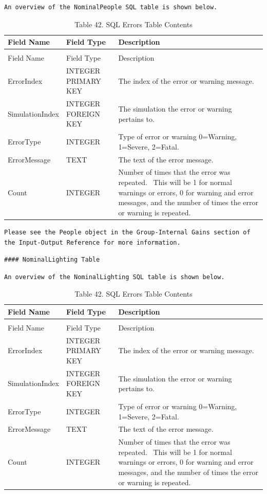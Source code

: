 \begin{lstlisting}
An overview of the NominalPeople SQL table is shown below.
\end{lstlisting}

\begin{longtable}[c]{p{1.5in}p{1.5in}p{2.99in}}
\caption{Table 42. SQL Errors Table Contents \label{table:table-42.-sql-errors-table-contents}} \tabularnewline
\toprule 
Field Name & Field Type & Description \tabularnewline
\midrule
\endfirsthead

\caption[]{Table 42. SQL Errors Table Contents} \tabularnewline
\toprule 
Field Name & Field Type & Description \tabularnewline
\midrule
\endhead

ErrorIndex & INTEGER PRIMARY KEY & The index of the error or warning message. \tabularnewline
SimulationIndex & INTEGER FOREIGN KEY & The simulation the error or warning pertains to. \tabularnewline
ErrorType & INTEGER & Type of error or warning 0=Warning, 1=Severe, 2=Fatal. \tabularnewline
ErrorMessage & TEXT & The text of the error message. \tabularnewline
Count & INTEGER & Number of times that the error was repeated.~ This will be 1 for normal warnings or errors, 0 for warning and error messages, and the number of times the error or warning is repeated. \tabularnewline
\bottomrule
\end{longtable}

\begin{lstlisting}
Please see the People object in the Group-Internal Gains section of the Input-Output Reference for more information.
\end{lstlisting}

\begin{lstlisting}
#### NominalLighting Table
\end{lstlisting}

\begin{lstlisting}
An overview of the NominalLighting SQL table is shown below.
\end{lstlisting}

\begin{longtable}[c]{p{1.5in}p{1.5in}p{2.99in}}
\caption{Table 42. SQL Errors Table Contents \label{table:table-42.-sql-errors-table-contents}} \tabularnewline
\toprule 
Field Name & Field Type & Description \tabularnewline
\midrule
\endfirsthead

\caption[]{Table 42. SQL Errors Table Contents} \tabularnewline
\toprule 
Field Name & Field Type & Description \tabularnewline
\midrule
\endhead

ErrorIndex & INTEGER PRIMARY KEY & The index of the error or warning message. \tabularnewline
SimulationIndex & INTEGER FOREIGN KEY & The simulation the error or warning pertains to. \tabularnewline
ErrorType & INTEGER & Type of error or warning 0=Warning, 1=Severe, 2=Fatal. \tabularnewline
ErrorMessage & TEXT & The text of the error message. \tabularnewline
Count & INTEGER & Number of times that the error was repeated.~ This will be 1 for normal warnings or errors, 0 for warning and error messages, and the number of times the error or warning is repeated. \tabularnewline
\bottomrule
\end{longtable}

